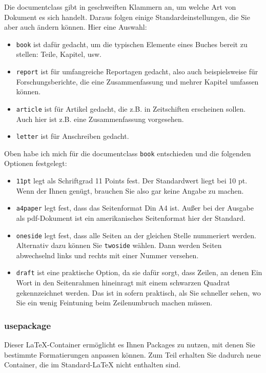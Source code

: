 Die documentclass gibt in geschweiften Klammern an, um welche Art von Dokument es sich handelt. Daraus folgen einige Standardeinstellungen, die Sie aber auch ändern können. Hier eine Auswahl:

\begin{itemize}
	\item \verb|book| ist dafür gedacht, um die typischen Elemente eines Buches bereit zu stellen: Teile, Kapitel, usw.
	\item \verb|report| ist für umfangreiche Reportagen gedacht, also auch beispielsweise für Forschungsberichte, die eine Zusammenfassung und mehrer Kapitel umfassen können.
	\item \verb|article| ist für Artikel gedacht, die z.B. in Zeitschiften erscheinen sollen. Auch hier ist z.B. eine Zusammenfassung vorgesehen.
	\item \verb|letter| ist für Anschreiben gedacht.
\end{itemize}

Oben habe ich mich für die documentclass \verb|book| entschieden und die folgenden Optionen festgelegt:

\begin{itemize}
	\item \verb|11pt| legt als Schriftgrad 11 Points fest. Der Standardwert liegt bei 10 pt. Wenn der Ihnen genügt, brauchen Sie also gar keine Angabe zu machen.
	\item \verb|a4paper| legt fest, dass das Seitenformat Din A4 ist. Außer bei der Ausgabe als pdf-Dokument ist ein amerikanisches Seitenformat hier der Standard.
	\item \verb|oneside| legt fest, dass alle Seiten an der gleichen Stelle nummeriert werden. Alternativ dazu können Sie \verb|twoside| wählen. Dann werden Seiten abwechselnd links und rechts mit einer Nummer versehen.
	\item \verb|draft| ist eine praktische Option, da sie dafür sorgt, dass Zeilen, an denen Ein Wort in den Seitenrahmen hineinragt mit einem schwarzen Quadrat gekennzeichnet werden. Das ist in sofern praktisch, als Sie schneller sehen, wo Sie ein wenig Feintuning beim Zeilenumbruch machen müssen.
\end{itemize}

\subsubsection{usepackage}

Dieser LaTeX-Container ermöglicht es Ihnen Packages zu nutzen, mit denen Sie bestimmte Formatierungen anpassen können. Zum Teil erhalten Sie dadurch neue Container, die im \glqq{}Standard-\grqq{}LaTeX nicht enthalten sind.\\

